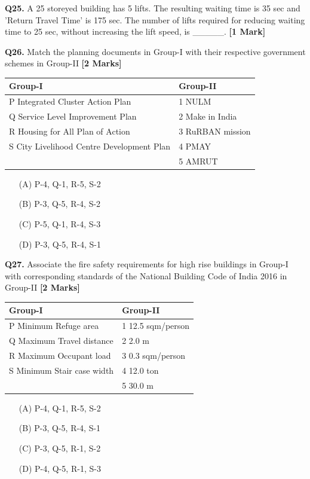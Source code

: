 \documentclass[11pt]{article}
\newcommand{\questiona}[2]{
    \noindent\textbf{Q#2.} #1 \hfill \textbf{[1 Mark]}
}
\newcommand{\questionb}[2]{
    \noindent\textbf{Q#2.} #1 \hfill \textbf{[2 Marks]}
}
\begin{document}
\questiona{A 25 storeyed building has 5 lifts. The resulting waiting time is 35 sec and 'Return Travel Time' is 175 sec. The number of lifts required for reducing waiting time to 25 sec, without increasing the lift speed, is \_\_\_\_\_.}{25}
\vspace{0.5cm}

\questionb{Match the planning documents in Group-I with their respective government schemes in Group-II}{26}
\begin{tabularx}{\textwidth}{|l|X|}
\hline
\textbf{Group-I} & \textbf{Group-II} \\
\hline
P Integrated Cluster Action Plan & 1 NULM \\
Q Service Level Improvement Plan & 2 Make in India \\
R Housing for All Plan of Action & 3 RuRBAN mission \\
S City Livelihood Centre Development Plan & 4 PMAY \\
 & 5 AMRUT \\
\hline
\end{tabularx}
\begin{enumerate}
    \item[(A)] P-4, Q-1, R-5, S-2
    \item[(B)] P-3, Q-5, R-4, S-2
    \item[(C)] P-5, Q-1, R-4, S-3
    \item[(D)] P-3, Q-5, R-4, S-1
\end{enumerate}
\vspace{0.5cm}

\questionb{Associate the fire safety requirements for high rise buildings in Group-I with corresponding standards of the National Building Code of India 2016 in Group-II}{27}
\begin{tabularx}{\textwidth}{|l|X|}
\hline
\textbf{Group-I} & \textbf{Group-II} \\
\hline
P Minimum Refuge area & 1 12.5 sqm/person \\
Q Maximum Travel distance & 2 2.0 m \\
R Maximum Occupant load & 3 0.3 sqm/person \\
S Minimum Stair case width & 4 12.0 ton \\
 & 5 30.0 m \\
\hline
\end{tabularx}
\begin{enumerate}
    \item[(A)] P-4, Q-1, R-5, S-2
    \item[(B)] P-3, Q-5, R-4, S-1
    \item[(C)] P-3, Q-5, R-1, S-2
    \item[(D)] P-4, Q-5, R-1, S-3
\end{enumerate}
\vspace{0.5cm}
\end{document}
